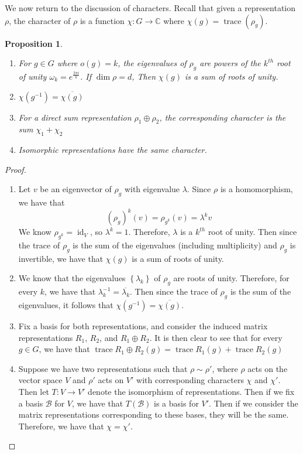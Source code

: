 \documentclass[psamsfonts]{amsart}
\newtheorem{prop}[thm]{Proposition}
\theoremstyle{definition}
\theoremstyle{remark}
\newcommand{\C}{\mathbb{C}}
\newcommand{\inv}{^{-1}}
\newcommand{\set}[1]{\left\lbrace#1 \right\rbrace}
\DeclareMathOperator{\id}{id}
\DeclareMathOperator{\trace}{trace}
\begin{document}
We now return to the discussion of characters. Recall that given a representation $\rho$, the character of $\rho$ is a function $\chi: G \to \C$ where $\chi(g) = \trace(\rho_g)$.

\begin{prop}\ \\ \vspace{-\baselineskip}
\begin{enumerate}
\item For $g \in G$ where $o(g) = k$, the eigenvalues of $\rho_g$ are powers of the $k^{th}$ root of unity $\omega_k = e^{\frac{2\pi i}{k}}$. If $\dim \rho = d$, Then $\chi(g)$ is a sum of roots of unity.
\item $\chi(g\inv) = \overline{\chi(g)}$
\item For a direct sum representation $\rho_1 \oplus \rho_2$, the corresponding character is the sum $\chi_1 + \chi_2$
\item Isomorphic representations have the same character.
\end{enumerate}
\end{prop}

\begin{proof}\ \\ \vspace{-\baselineskip}
\begin{enumerate}
\item Let $v$ be an eigenvector of $\rho_g$ with eigenvalue $\lambda$. Since $\rho$ is a homomorphism, we have that 
$$(\rho_g)^k(v) = \rho_{g^k}(v) = \lambda^k v $$
We know $\rho_{g^k} = \id_V$, so $\lambda^k = 1$. Therefore, $\lambda$ is a $k^{th}$ root of unity. Then since the trace of $\rho_g$ is the sum of the eigenvalues (including multiplicity) and $\rho_g$ is invertible, we have that $\chi(g)$ is a sum of roots of unity.
\item We know that the eigenvalues $\set{\lambda_k}$ of $\rho_g$ are roots of unity. Therefore, for every $k$, we have that $\lambda_k\inv = \overline{\lambda_k}$. Then since the trace of $\rho_g$ is the sum of the eigenvalues, it follows that $\chi(g\inv) = \overline{\chi(g)}$.
\item Fix a basis for both representations, and consider the induced matrix representations $R_1$, $R_2$, and $R_1 \oplus R_2$. It is then clear to see that for every $g \in G$, we have that $\trace{R_1\oplus R_2 (g)} = \trace{R_1(g)} + \trace{R_2(g)}$
\item Suppose we have two representations such that $\rho \sim \rho'$, where $\rho$ acts on the vector space $V$ and $\rho'$ acts on $V'$ with corresponding characters $\chi$ and $\chi'$. Then let $T: V \to V'$ denote the isomorphism of representations. Then if we fix a basis $\mathscr{B}$ for $V$, we have that $T(\mathscr{B})$ is a basis for $V'$. Then if we consider the matrix representations corresponding to these bases, they will be the same. Therefore, we have that $\chi = \chi'$.
\end{enumerate}
\end{proof}
\end{document}
